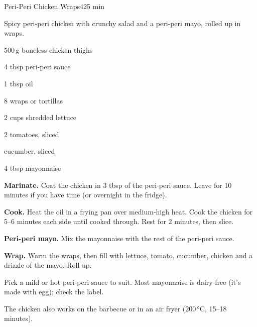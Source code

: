 \begin{recipebox}{Peri-Peri Chicken Wraps}{4}{25 min}

Spicy peri-peri chicken with crunchy salad and a peri-peri mayo, rolled up in
wraps.

\begin{ingredients}
  \item 500\,g boneless chicken thighs
  \item 4 tbsp peri-peri sauce
  \item 1 tbsp oil
  \item 8 wraps or tortillas
  \item 2 cups shredded lettuce
  \item 2 tomatoes, sliced
  \item {} cucumber, sliced
  \item 4 tbsp mayonnaise
\end{ingredients}

\begin{method}
  \item \textbf{Marinate.} Coat the chicken in 3 tbsp of the peri-peri sauce. Leave
        for 10 minutes if you have time (or overnight in the fridge).
  \item \textbf{Cook.} Heat the oil in a frying pan over medium-high heat. Cook the
        chicken for 5--6 minutes each side until cooked through. Rest for 2
        minutes, then slice.
  \item \textbf{Peri-peri mayo.} Mix the mayonnaise with the rest of the peri-peri
        sauce.
  \item \textbf{Wrap.} Warm the wraps, then fill with lettuce, tomato, cucumber,
        chicken and a drizzle of the mayo. Roll up.
\end{method}

\begin{notelist}
  \item Pick a mild or hot peri-peri sauce to suit. Most mayonnaise is dairy-free
        (it's made with egg); check the label.
  \item The chicken also works on the barbecue or in an air fryer (200\,°C, 15--18
        minutes).
\end{notelist}

\end{recipebox}
